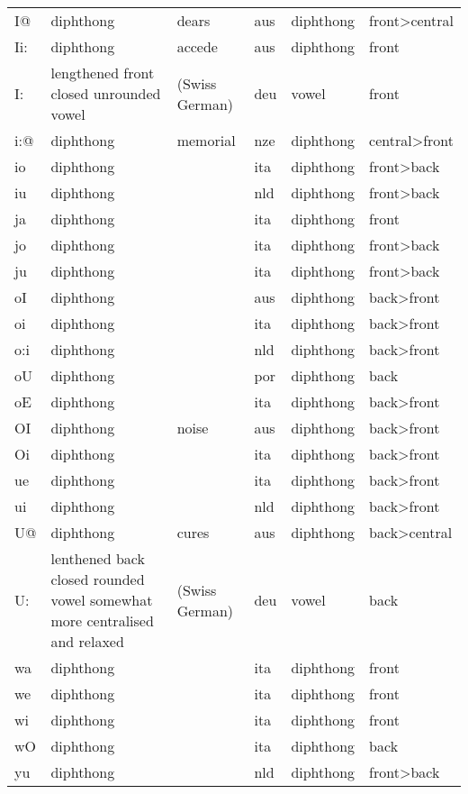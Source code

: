 {\begin{longtable}{l|p{.3\linewidth}|p{.15\linewidth}|l|p{.15\linewidth}|l}
	I@	& diphthong	& dears	& aus	& diphthong	& front\textgreater central	\\
	Ii:	& diphthong	& accede	& aus	& diphthong	& front	\\
	I:	& lengthened front closed unrounded vowel	& (Swiss German)	& deu	& vowel	& front	\\
	i:@	& diphthong	& memorial	& nze	& diphthong	& central\textgreater front	\\
	io	& diphthong	& 	& ita	& diphthong	& front\textgreater back	\\
	iu	& diphthong	& 	& nld	& diphthong	& front\textgreater back	\\
	ja	& diphthong	& 	& ita	& diphthong	& front	\\
	jo	& diphthong	& 	& ita	& diphthong	& front\textgreater back	\\
	ju	& diphthong	& 	& ita	& diphthong	& front\textgreater back	\\
	oI	& diphthong	& 	& aus	& diphthong	& back\textgreater front	\\
	oi	& diphthong	& 	& ita	& diphthong	& back\textgreater front	\\
	o:i	& diphthong	& 	& nld	& diphthong	& back\textgreater front	\\
	oU	& diphthong	& 	& por	& diphthong	& back	\\
	oE	& diphthong	& 	& ita	& diphthong	& back\textgreater front	\\
	OI	& diphthong	& noise	& aus	& diphthong	& back\textgreater front	\\
	Oi	& diphthong	& 	& ita	& diphthong	& back\textgreater front	\\
	ue	& diphthong	& 	& ita	& diphthong	& back\textgreater front	\\
	ui	& diphthong	& 	& nld	& diphthong	& back\textgreater front	\\
	U@	& diphthong	& cures	& aus	& diphthong	& back\textgreater central	\\
	U:	& lenthened back closed rounded vowel somewhat more centralised and relaxed	& (Swiss German)	& deu	& vowel	& back	\\
	wa	& diphthong	& 	& ita	& diphthong	& front	\\
	we	& diphthong	& 	& ita	& diphthong	& front	\\
	wi	& diphthong	& 	& ita	& diphthong	& front	\\
	wO	& diphthong	& 	& ita	& diphthong	& back	\\
	yu	& diphthong	& 	& nld	& diphthong	& front\textgreater back	\\

\end{longtable}}
